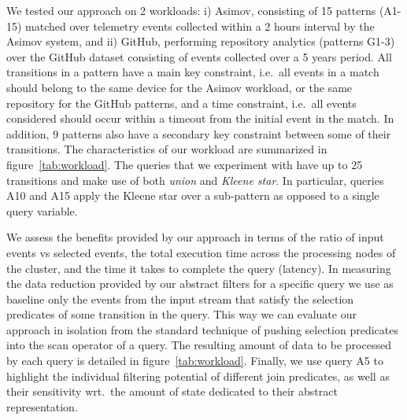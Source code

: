 We tested our approach on 2 workloads:
i) Asimov, consisting of 15 patterns (A1-15) matched over telemetry events
collected within a 2 hours interval by the Asimov system, and 
ii) GitHub, performing repository analytics (patterns G1-3) over the GitHub
dataset consisting of events collected over a 5 years period.
All transitions in a pattern have a main key constraint, i.e.\ all events in a
match should belong to the same device for the Asimov workload, or the same
repository for the GitHub patterns, and a time constraint, i.e.\ all events 
considered should occur within a timeout from the initial event in the match.
In addition, 9 patterns also have a secondary key constraint between some of
their transitions.
The characteristics of our workload are summarized in figure~\ref{tab:workload}.
The queries that we experiment with have up to 25 transitions and make use of
both {\em union} and {\em Kleene star}. 
In particular, queries A10 and A15 apply the Kleene star over a sub-pattern as
opposed to a single query variable.



We assess the benefits provided by our approach in terms of 
the ratio of input events vs selected events, 
the total execution time across the processing nodes of the cluster,
and the time it takes to complete the query (latency).
In measuring the data reduction provided by our abstract filters for a specific
query we use as baseline only the events from the input stream that satisfy the
selection predicates of some transition in the query. 
This way we can evaluate our approach in isolation from the standard technique
of pushing selection predicates into the scan operator of a query. 
The resulting amount of data to be processed by each query is detailed in
figure~\ref{tab:workload}.
Finally, we use query A5 to highlight the individual filtering potential
of different join predicates, as well as their sensitivity wrt.\ the amount of
state dedicated to their abstract representation.

